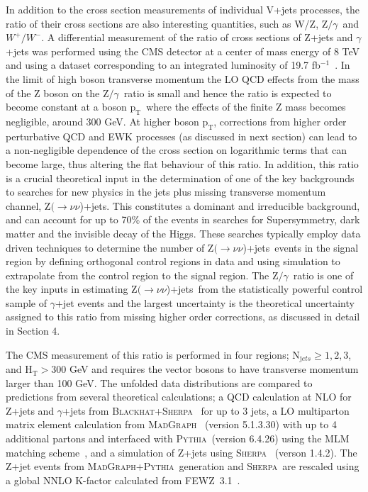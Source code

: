 \documentclass[a4paper,11pt,notoc]{article}
\newcommand{\Znunuj}   {\mbox{${\mathrm Z}(\rightarrow\nu \nu$)+jets}}
\newcommand{\pt}{\ensuremath{\mathrm{p_T}}}
\newcommand{\Ht}{\ensuremath{\mathrm{H_T}}}
\newcommand{\PYTHIA}{\textsc{Pythia}}
\newcommand{\SHERPA}{\textsc{Sherpa}}
\newcommand{\BLACKHAT}{\textsc{Blackhat}}
\newcommand{\FEWZ}{\textsc{FEWZ}}
\newcommand{\MADGRAPH}{\textsc{MadGraph}}
\newcommand{\zgamma}{\mbox{${\mathrm Z/\gamma}$}}
\begin{document}
In addition to the cross section measurements of individual V+jets processes, the ratio of their cross sections are also interesting quantities, such as W/Z, \zgamma\ and $W^{+}/W^{-}$.
A differential measurement of the ratio of cross sections of Z+jets and $\gamma$+jets was performed using the CMS detector at a center of mass energy of 8 TeV and using a dataset corresponding to an integrated luminosity of 19.7 fb$^{-1}$~\cite{Khachatryan:2015ira}. 
In the limit of high boson transverse momentum the LO QCD effects from the mass of the Z boson on the \zgamma\ ratio is small and hence the ratio is expected to become constant at a boson \pt\ where the effects of the finite Z mass becomes negligible, around 300 GeV. At higher boson \pt, corrections from higher order perturbative QCD and EWK processes (as discussed in next section) can lead to a non-negligible dependence of the cross section on logarithmic terms that can become large, thus altering the flat behaviour of this ratio. 
In addition, this ratio is a crucial theoretical input in the determination of one of the key backgrounds to searches for new physics in the jets plus missing transverse momentum channel, \Znunuj. This constitutes a dominant and irreducible background, and can account for up to 70\% of the events in searches for Supersymmetry, dark matter and the invisible decay of the Higgs. These searches typically employ data driven techniques to determine the number of \Znunuj\ events in the signal region by defining orthogonal control regions in data and using simulation to extrapolate from the control region to the signal region. The \zgamma\ ratio is one of the key inputs in estimating \Znunuj\ from the statistically powerful control sample of $\gamma$+jet events and the largest uncertainty is the theoretical uncertainty assigned to this ratio from missing higher order corrections, as discussed in detail in Section 4. 

The CMS measurement of this ratio is performed in four regions; N$_{\mathrm jets} \ge 1, 2, 3$, and $\Ht > 300$ GeV and requires the vector bosons to have transverse momentum larger than 100 GeV. The unfolded data distributions are compared to predictions from several theoretical calculations; a QCD calculation at NLO for Z+jets and $\gamma$+jets from \BLACKHAT+\SHERPA~\cite{Bern:2012vx} for up to 3 jets, a LO multiparton matrix element calculation from \MADGRAPH~\cite{Alwall:2011uj} (version 5.1.3.30) with up to 4 additional partons and interfaced with \PYTHIA\ (version 6.4.26) using the MLM matching scheme~\cite{Alwall:2007fs}, and a simulation of Z+jets using \SHERPA~\cite{Gleisberg:2008ta} (verson 1.4.2).   
The Z+jet events from \MADGRAPH+\PYTHIA\ generation and \SHERPA\ are rescaled using a global NNLO K-factor calculated from \FEWZ\ 3.1~\cite{Gavin:2010az}.
\end{document}
